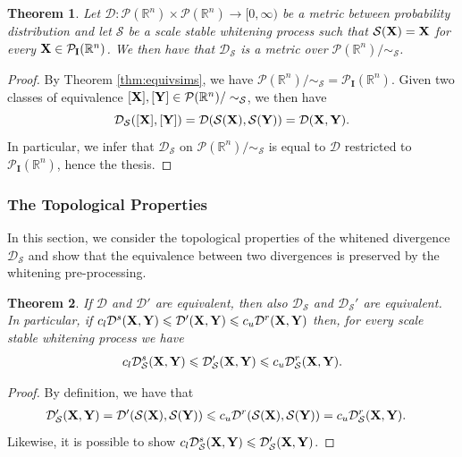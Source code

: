 \documentclass{article}
\renewcommand{\le}{\leqslant}
\renewcommand{\to}{\rightarrow}
\def\DDSS{\mathcal{D}_\mathcal{S}}
\def \Id{\mathbf{I}}
\def\bX{{\bf X}}
\def\bY{{\bf Y}}
\def \PP{\mathcal{P}}
\def \simS{\sim_{\mathcal{S}}}
\def \erre{\mathbb{R}}
\newtheorem{theorem}{Theorem}
\newtheorem{proof}{Proof}
\begin{document}
\begin{theorem}
    Let $\mathcal{D}:\PP(\erre^n)\times\PP(\erre^n)\to[0,\infty)$ be a metric between probability distribution and let $\mathcal{S}$ be a scale stable whitening process such that $\mathcal{S}(\bX)=\bX$ for every $\bX\in\PP_{\Id}(\erre^n)$.
    We then have that $\DDSS$ is a metric over $\PP(\erre^n)/\simS$.
\end{theorem}



\begin{proof}
    By Theorem \ref{thm:equivsims}, we have $\PP(\erre^n)/\sim_\mathcal{S}=\PP_{\Id}(\erre^n)$.
    Given two classes of equivalence $[\bX],[\bY]\in\PP(\erre^n)/\sim_\mathcal{S}$, we then have
    \[
        \DDSS([\bX],[\bY])=\mathcal{D}(\mathcal{S}(\bX),\mathcal{S}(\bY))=\mathcal{D}(\bX,\bY).
    \]
    In particular, we infer that $\DDSS$ on $\PP(\erre^n)/\sim_\mathcal{S}$ is equal to $\mathcal{D}$ restricted to $\PP_{\Id}(\erre^n)$, hence the thesis.
\end{proof}







\subsubsection{The Topological Properties} 

% 
In this section, we consider the topological properties of the whitened divergence $\DDSS$ and show that the equivalence between two divergences is preserved by the whitening pre-processing.



\begin{theorem}
    If $\mathcal{D}$ and $\mathcal{D}'$ are equivalent, then also $\DDSS$ and $\DDSS'$ are equivalent.
    In particular, if $c_l\mathcal{D}^s(\bX,\bY)\le \mathcal{D}'(\bX,\bY)\le c_u\mathcal{D}^r(\bX,\bY)$ then, for every scale stable whitening process we have
    \begin{equation}
        c_l\DDSS^s(\bX,\bY)\le \DDSS'(\bX,\bY)\le c_u\DDSS^r(\bX,\bY).
    \end{equation}
\end{theorem}

\begin{proof}
    By definition, we have that
    \begin{align*}
        \DDSS'(\bX,\bY)&=\mathcal{D}'(\mathcal{S}(\bX),\mathcal{S}(\bY))\le c_u\mathcal{D}^r(\mathcal{S}(\bX),\mathcal{S}(\bY))=c_u\DDSS^r(\bX,\bY).
    \end{align*}
    Likewise, it is possible to show $c_l\DDSS^s(\bX,\bY)\le\DDSS'(\bX,\bY)$.
\end{proof}
\end{document}
